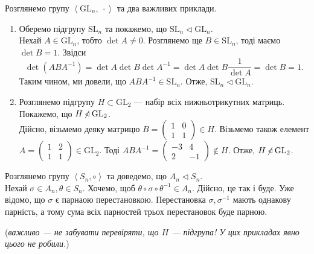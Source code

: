 \documentclass{math_library}
\begin{document}
\begin{example}
Розглянемо групу $\left<\mathrm{GL}_n,\ \cdot \right>$ та два важливих приклади.
\begin{enumerate}[wide=0pt,label={\arabic*)}]
\item Оберемо підгрупу $\mathrm{SL}_n$ та покажемо, що $\mathrm{SL}_n \triangleleft \mathrm{GL}_n$.\\
Нехай $A \in \mathrm{GL}_n$, тобто $\det A \neq 0$. Розглянемо ще $B \in \mathrm{SL}_n$, тоді маємо $\det B = 1$. Звідси
\[
\det (ABA^{-1}) = \det A \det B \det A^{-1} = \det A \det B \dfrac{1}{\det A} = \det B = 1.
\]
Таким чином, ми довели, що $ABA^{-1} \in \mathrm{SL}_n$. Отже, $\mathrm{SL}_n \triangleleft \mathrm{GL}_n$.

\item Розглянемо підгрупу $H \subset \mathrm{GL}_2$ --- набір всіх нижньотрикутних матриць. Покажемо, що $H \centernot\triangleleft \mathrm{GL}_2$.\\
Дійсно, візьмемо деяку матрицю $B = \begin{pmatrix}
1 & 0 \\
1 & 1
\end{pmatrix} \in H$. Візьмемо також елемент $A = \begin{pmatrix}
1 & 2\\
1 & 1
\end{pmatrix} \in \mathrm{GL}_2$. Тоді $ABA^{-1} = \begin{pmatrix}
-3 & 4 \\
2 & -1
\end{pmatrix} \not \in H$. Отже, $H \centernot\triangleleft \mathrm{GL}_2$.
\end{enumerate}
\end{example}

\begin{example}
Розглянемо групу $\left<S_n, \circ\right>$ та доведемо, що $A_n \triangleleft S_n$.\\
Нехай $\sigma \in A_n, \theta \in S_n$. Хочемо, щоб $\theta \circ \sigma \circ \theta^{-1} \in A_n$. Дійсно, це так і буде. Уже відомо, що $\sigma$ є парнаою перестановкою. Перестановка $\sigma, \sigma^{-1}$ мають однакову парність, а тому сума всіх парностей трьох перестановок буде парною.
\end{example}

(\textit{важливо --- не забувати перевіряти, що $H$ --- підгрупа! У цих прикладах явно цього не робили.})
\end{document}
